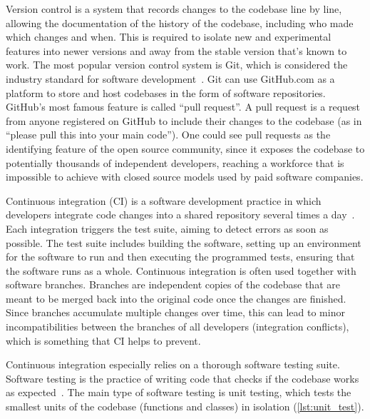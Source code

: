 Version control is a system that records changes to the codebase line by line,
allowing the documentation of the history of the codebase, including who made
which changes and when. This is required to isolate new and experimental
features into newer versions and away from the stable version that's known to
work. The most popular version control system is Git, which is considered the
industry standard for software development~\cite{chaconGitBook2024}. Git can use
GitHub.com as a platform to store and host codebases in the form of software
repositories. GitHub's most famous feature is called ``pull request''. A pull
request is a request from anyone registered on GitHub to include their changes
to the codebase (as in ``please pull this into your main code''). One could see
pull requests as the identifying feature of the open source community, since it
exposes the codebase to potentially thousands of independent developers,
reaching a workforce that is impossible to achieve with closed source models
used by paid software companies.

Continuous integration (CI) is a software development practice in which
developers integrate code changes into a shared repository several times a
day~\cite{duvall2007continuous}. Each integration triggers the test suite,
aiming to detect errors as soon as possible. The test suite includes building
the software, setting up an environment for the software to run and then
executing the programmed tests, ensuring that the software runs as a whole.
Continuous integration is often used together with software branches. Branches
are independent copies of the codebase that are meant to be merged back into the
original code once the changes are finished. Since branches accumulate multiple
changes over time, this can lead to minor incompatibilities between the branches
of all developers (integration conflicts), which is something that CI helps to
prevent.

Continuous integration especially relies on a thorough software testing suite.
Software testing is the practice of writing code that checks if the codebase
works as expected~\cite{10.5555/2161638}. The main type of software testing is
unit testing, which tests the smallest units of the codebase (functions and
classes) in isolation (\autoref{lst:unit_test}).


